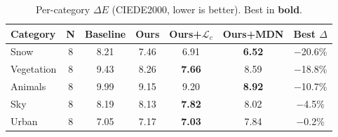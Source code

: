 \begin{table}[t]
\centering
\caption{Per-category $\Delta E$ (CIEDE2000, lower is better). Best in \textbf{bold}.}
\label{tab:category}
\small
\begin{tabular}{lcccccc}
\toprule
Category & N & Baseline & Ours & Ours+$\mathcal{L}_c$ & Ours+MDN & Best $\Delta$ \\
\midrule
Snow & 8 & 8.21 & 7.46 & 6.91 & \textbf{6.52} & $-$20.6\% \\
Vegetation & 8 & 9.43 & 8.26 & \textbf{7.66} & 8.59 & $-$18.8\% \\
Animals & 8 & 9.99 & 9.15 & 9.20 & \textbf{8.92} & $-$10.7\% \\
Sky & 8 & 8.19 & 8.13 & \textbf{7.82} & 8.02 & $-$4.5\% \\
Urban & 8 & 7.05 & 7.17 & \textbf{7.03} & 7.84 & $-$0.2\% \\
\bottomrule
\end{tabular}
\end{table}